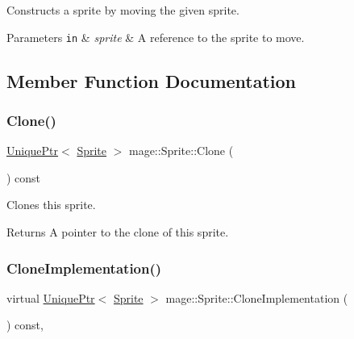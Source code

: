Constructs a sprite by moving the given sprite.


\begin{DoxyParams}[1]{Parameters}
\mbox{\tt in}  & {\em sprite} & A reference to the sprite to move. \\
\hline
\end{DoxyParams}


\subsection{Member Function Documentation}
\hypertarget{classmage_1_1_sprite_a66e27a8a98ac5a4289e8440ef8193718}{}\label{classmage_1_1_sprite_a66e27a8a98ac5a4289e8440ef8193718} 
\subsubsection{\texorpdfstring{Clone()}{Clone()}}
{\footnotesize\ttfamily \hyperlink{namespacemage_a3316d7143a973e37adf1110f2e80ca31}{Unique\+Ptr}$<$ \hyperlink{classmage_1_1_sprite}{Sprite} $>$ mage\+::\+Sprite\+::\+Clone (\begin{DoxyParamCaption}{ }\end{DoxyParamCaption}) const}

Clones this sprite.

\begin{DoxyReturn}{Returns}
A pointer to the clone of this sprite. 
\end{DoxyReturn}
\hypertarget{classmage_1_1_sprite_a214890d7da493bccadb2327b8c7ffb09}{}\label{classmage_1_1_sprite_a214890d7da493bccadb2327b8c7ffb09} 
\subsubsection{\texorpdfstring{Clone\+Implementation()}{CloneImplementation()}}
{\footnotesize\ttfamily virtual \hyperlink{namespacemage_a3316d7143a973e37adf1110f2e80ca31}{Unique\+Ptr}$<$ \hyperlink{classmage_1_1_sprite}{Sprite} $>$ mage\+::\+Sprite\+::\+Clone\+Implementation (\begin{DoxyParamCaption}{ }\end{DoxyParamCaption}) const\hspace{0.3cm}{\ttfamily [private]}, {}}

